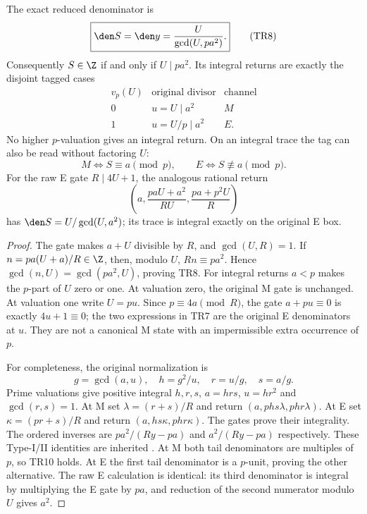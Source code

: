 \begin{theorem}\label{thm:raw}
The exact reduced denominator is
\[
 \boxed{\den S=\den y=\frac{U}{\gcd(U,pa^2)}.}           \tag{TR8}
\]
Consequently $S\in\Z$ if and only if $U\mid pa^2$. Its integral returns are
exactly the disjoint tagged cases
\[
 \begin{array}{c|c|c}
 v_p(U)&\text{original divisor}&\text{channel}\\\hline
 0&u=U\mid a^2&M\\
 1&u=U/p\mid a^2&E.
 \end{array}                                           \tag{TR9}
\]
No higher $p$-valuation gives an integral return. On an integral trace the tag
can also be read without factoring $U$:
\[
 \boxed{M\iff S\equiv a\pmod p,\qquad E\iff S\not\equiv a\pmod p.}
                                                               \tag{TR10}
\]
For the raw E gate $R\mid4U+1$, the analogous rational return
\[
 \left(a,\frac{paU+a^2}{RU},\frac{pa+p^2U}{R}\right)
\]
has $\den S=U/\gcd(U,a^2)$; its trace is integral exactly on the original E box.
\end{theorem}
\begin{proof}
The gate makes $a+U$ divisible by $R$, and $\gcd(U,R)=1$. If
$n=pa(U+a)/R\in\Z$, then, modulo $U$,
$Rn\equiv pa^2$. Hence $\gcd(n,U)=\gcd(pa^2,U)$, proving TR8. For integral
returns $a<p$ makes the $p$-part of $U$ zero or one. At valuation zero, the
original M gate is unchanged. At valuation one write $U=pu$. Since
$p\equiv4a\pmod R$, the gate $a+pu\equiv0$ is exactly $4u+1\equiv0$; the two
expressions in TR7 are the original E denominators at $u$. They are not a
canonical M state with an impermissible extra occurrence of $p$.

For completeness, the original normalization is
\[
 g=\gcd(a,u),\quad h=g^2/u,\quad r=u/g,\quad s=a/g.
\]
Prime valuations give positive integral $h,r,s$, $a=hrs$, $u=hr^2$ and
$\gcd(r,s)=1$. At M set $\lambda=(r+s)/R$ and return
$(a,phs\lambda,phr\lambda)$. At E set $\kappa=(pr+s)/R$ and return
$(a,hs\kappa,phr\kappa)$. The gates prove their integrality. The ordered
inverses are $pa^2/(Ry-pa)$ and $a^2/(Ry-pa)$ respectively. These Type-I/II
identities are inherited \cite[\S2, Propositions 2.2 and 2.6]{ET}.
At M both tail denominators are multiples of $p$, so TR10 holds. At E the first
tail denominator is a $p$-unit, proving the other alternative. The raw E
calculation is identical: its third denominator is integral by multiplying the
E gate by $pa$, and reduction of the second numerator modulo $U$ gives $a^2$.
\end{proof}


